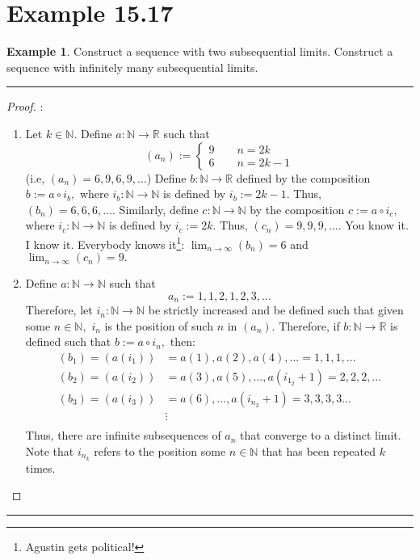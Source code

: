 \documentclass[openany, amssymb, psamsfonts]{amsart}
\newcommand{\bbN}{\mathbb{N}}
\newcommand{\bbR}{\mathbb{R}}
\theoremstyle{definition}
\newtheorem{exmp}{Example}[section]
\numberwithin{equation}{section}
\begin{document}
\section*{Example 15.17}
\begin{exmp}
	Construct a sequence with two subsequential limits. Construct a sequence with infinitely many subsequential limits.
\end{exmp}
\vspace{4pt}     \hrule   \vspace{4pt}\begin{proof}:\\
\begin{enumerate}
    \item Let $k\in \bbN.$ Define $a: \bbN \to \bbR$ such that \[(a_n) :=
\begin{cases} 
9 \qquad n = 2k\\
6 \qquad n = 2k-1
\end{cases}\] (i.e, $(a_n) = 6,9,6,9,\dots$) Define $b: \bbN \to \bbR$ defined by the composition $b:= a \circ i_b,$ where $i_b:\bbN \to \bbN$ is defined by $i_b:= 2k-1.$ Thus, $(b_n) = 6,6,6,\dots.$ Similarly, define $c:\bbN \to \bbN$ by the composition $c:=a \circ i_c,$ where $i_c: \bbN \to \bbN$ is defined by $i_c:= 2k.$ Thus, $(c_n) = 9,9,9,\dots.$ You know it. I know it. Everybody knows it\footnote{Agustin gets political!}: $\lim_{n\to \infty}(b_n) = 6$ and $\lim_{n\to\infty}(c_n) = 9.$
\item Define $a: \bbN \to \bbN$ such that 
\[a_n:= 1, 1,2, 1,2,3, \dots\] Therefore, let $i_n: \bbN \to \bbN$ be strictly increased and be defined such that given some $n\in \bbN,$ $i_n$ is the position of such $n$ in $(a_n).$ Therefore, if $b: \bbN \to \bbR$ is defined such that $b := a \circ i_n,$ then:
\begin{align*}
    (b_1) = (a(i_1)) &=  a(1), a(2), a(4), \dots = 1,1,1,\dots\\
    (b_2) = (a(i_2)) &= a(3), a(5), \dots, a(i_{1_2} +1) = 2,2,2,\dots\\
    (b_3) = (a(i_3)) &= a(6), \dots, a(i_{n_2} +1) = 3,3,3,3\dots\\
    &\vdots\\
\end{align*}
Thus, there are infinite subsequences of $a_n$ that converge to a distinct limit. Note that $i_{n_k}$ refers to the position some $n\in \bbN$ that has been repeated $k$ times. 
\end{enumerate}

\end{proof}\vspace{4pt}     \hrule   \vspace{4pt}
\end{document}
